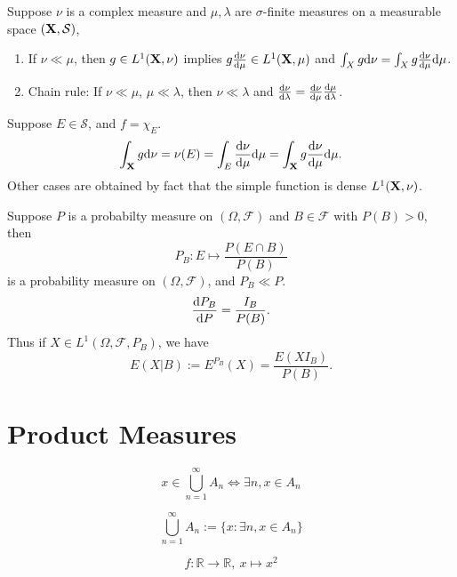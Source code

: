 \begin{stheorem}{}{}
Suppose $\nu$ is a complex measure and $\mu,\lambda$ are $\sigma$-finite measures on a measurable space $(\mathbf{X},\mathcal S)$, 
\begin{enumerate}
	\item If $\nu \ll \mu$, then $g \in L^1(\mathbf{X},\nu)$ implies $g\frac{\mathrm{d} \nu}{\mathrm{d} \mu}\in L^1(\mathbf{X},\mu)$	 and $\int_X g \mathrm{d} \nu=\int_X g\frac{\mathrm{d} \nu}{\mathrm{d} \mu} \mathrm{d}\mu$.
	\item Chain rule: If $\nu \ll \mu$, $\mu \ll \lambda$, then $\nu \ll \lambda$ and 
	$\frac{\mathrm{d} \nu}{\mathrm{d} \lambda} = \frac{\mathrm{d} \nu}{\mathrm{d} \mu}\frac{\mathrm{d} \mu}{
	\mathrm{d} \lambda}$.
\end{enumerate}	
\end{stheorem}
\begin{Proof}
Suppose $E\in \mathcal S$, and $f=\chi_E$.
$$
\int_{\mathbf{X}} g\mathrm{d} \nu =\nu(E) = \int_E \frac{\mathrm{d} \nu}{\mathrm{d} \mu}\mathrm{d} \mu = \int_{\mathbf{X}} g \frac{\mathrm{d}\nu}{\mathrm{d} \mu} \mathrm{d} \mu.
$$
Other cases are obtained by fact that the simple function is dense $L^1(\mathbf{X},\nu)$. \\
\end{Proof}








\begin{sexample}{}{}
Suppose $P$ is a probabilty measure on $(\Omega,\mathcal F)$ and $B\in \mathcal F$ with $P(B)>0$, then 
$$
P_B: E \mapsto \frac{P(E\cap B)}{P(B)}
$$ 
is a probability measure on $(\Omega,\mathcal F)$, and $P_B \ll P$.
$$
\frac{\mathrm{d} P_B}{\mathrm{d} P} = \frac{I_B}{P(B)}.
$$ 
Thus if $X \in L^1(\Omega,\mathcal F,P_B)$, we have 
$$
E(X|B) := E^{P_B}(X) = \frac{E(XI_B)}{P(B)}.
$$

\end{sexample}

\section{Product Measures}
$$
x \in \bigcup_{n=1}^{\infty} A_n \iff \exists n,x \in A_n
$$

$$
\bigcup_{n=1}^{\infty}A_n := \{ x: \exists n, x \in A_n  \}
$$


$$
f: \mathbb{R} \to \mathbb{R}, \ x \mapsto x^2 
$$

